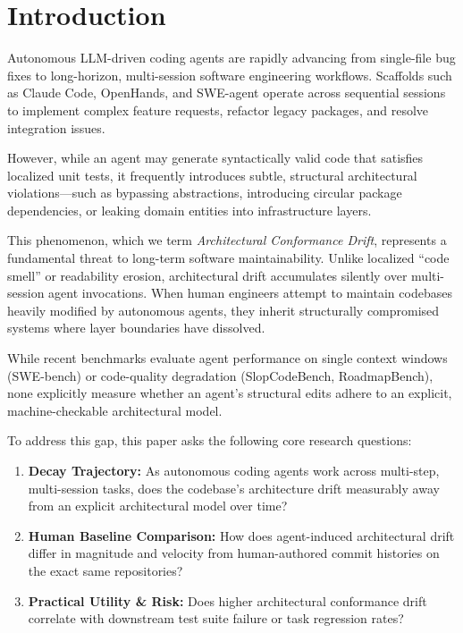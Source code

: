 \documentclass[11pt]{article}
\begin{document}

\section{Introduction}
\label{sec:introduction}

Autonomous LLM-driven coding agents are rapidly advancing from
single-file bug fixes to long-horizon, multi-session software
engineering workflows. Scaffolds such as Claude Code, OpenHands, and
SWE-agent operate across sequential sessions to implement complex
feature requests, refactor legacy packages, and resolve integration
issues.

However, while an agent may generate syntactically valid code that
satisfies localized unit tests, it frequently introduces subtle,
structural architectural violations---such as bypassing abstractions,
introducing circular package dependencies, or leaking domain entities
into infrastructure layers.

This phenomenon, which we term
\emph{Architectural Conformance Drift}, represents a fundamental threat
to long-term software maintainability. Unlike localized ``code smell''
or readability erosion, architectural drift accumulates silently over
multi-session agent invocations. When human engineers attempt to
maintain codebases heavily modified by autonomous agents, they inherit
structurally compromised systems where layer boundaries have dissolved.

While recent benchmarks evaluate agent performance on single context
windows (SWE-bench) or code-quality degradation (SlopCodeBench,
RoadmapBench), none explicitly measure whether an agent's structural
edits adhere to an explicit, machine-checkable architectural model.

To address this gap, this paper asks the following core research
questions:

\begin{enumerate}[
    leftmargin=2.5em,
    label=\textbf{RQ\arabic*},
    itemsep=0.45em
]

    \item
    \textbf{Decay Trajectory:}
    As autonomous coding agents work across multi-step, multi-session
    tasks, does the codebase's architecture drift measurably away from
    an explicit architectural model over time?

    \item
    \textbf{Human Baseline Comparison:}
    How does agent-induced architectural drift differ in magnitude and
    velocity from human-authored commit histories on the exact same
    repositories?

    \item
    \textbf{Practical Utility \& Risk:}
    Does higher architectural conformance drift correlate with
    downstream test suite failure or task regression rates?

\end{enumerate}
\end{document}
